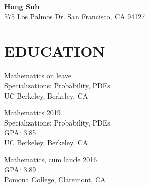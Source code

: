 \documentclass{simplecv}
\begin{document}
\thispagestyle{empty}

\begin{center}
  {\large\bf Hong Suh}\\
  575 Los Palmos Dr. San Francisco, CA 94127\\
\end{center}


\section{EDUCATION} 
\begin{multicols}{3}

 Mathematics \hfill on leave \\
Specializations: Probability, PDEs \hfill\\
UC Berkeley, Berkeley, CA

\columnbreak

 Mathematics \hfill 2019  \\
Specializations: Probability, PDEs \\
GPA: 3.85 \\
UC Berkeley, Berkeley, CA\\
\columnbreak

 Mathematics, cum laude \hfill 2016   \\
GPA: 3.89 \\%
                Pomona College, Claremont, CA \\

\end{multicols}
\vspace{-0.8cm} 
\end{document}
